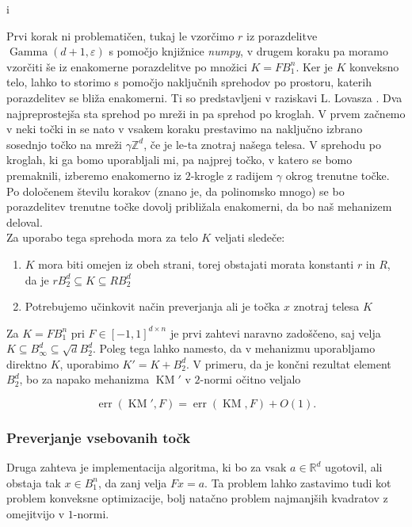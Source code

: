 i\documentclass[mat1]{fmfdelo}
\newcommand{\R}{\mathbb R}
\newcommand{\Z}{\mathbb Z}
\DeclareMathOperator{\KM}{KM}
\DeclareMathOperator*{\err}{err}
\begin{document}
Prvi korak ni problematičen, tukaj le vzorčimo $r$ iz porazdelitve $\operatorname{Gamma}(d+1, \varepsilon)$ s pomočjo knjižnice \emph{numpy}, v drugem koraku pa moramo vzorčiti še iz enakomerne porazdelitve po množici $K=FB_1^n$. Ker je $K$ konveksno telo, lahko to storimo s pomočjo naključnih sprehodov po prostoru, katerih porazdelitev se bliža enakomerni. Ti so predstavljeni v raziskavi L. Lovasza \cite{randomsurvey}.  Dva najpreprostejša sta sprehod po mreži in pa sprehod po kroglah. V prvem začnemo v neki točki in se nato v vsakem koraku prestavimo na naključno izbrano sosednjo točko na mreži $\gamma \Z^d$, če je le-ta znotraj našega telesa. V sprehodu po kroglah, ki ga bomo uporabljali mi, pa najprej točko, v katero se bomo premaknili, izberemo enakomerno iz $2$-krogle z radijem $\gamma$ okrog trenutne točke. Po določenem številu korakov (znano je, da polinomsko mnogo) se bo porazdelitev trenutne točke dovolj približala enakomerni, da bo naš mehanizem deloval. \\

\noindent Za uporabo tega sprehoda mora za telo $K$ veljati sledeče:
\begin{enumerate}
    \item $K$ mora biti omejen iz obeh strani, torej obstajati morata konstanti $r$ in $R$, da je $rB_2^d \subseteq K \subseteq RB_2^d$
    \item Potrebujemo učinkovit način preverjanja ali je točka $x$ znotraj telesa $K$
\end{enumerate}

Za $K=FB_1^n$ pri $F \in [-1,1]^{d\times n}$ je prvi zahtevi naravno zadoščeno, saj velja $K \subseteq B_\infty^d \subseteq \sqrt{d} B_2^d$. Poleg tega lahko namesto, da v mehanizmu uporabljamo direktno $K$, uporabimo $K' = K + B_2^d$. V primeru, da je končni rezultat element $B_2^d$, bo za napako mehanizma $\KM'$ v $2$-normi očitno veljalo

\begin{equation*}
    \err(\KM', F) = \err(\KM, F) + O(1).
\end{equation*}

\subsubsection{Preverjanje vsebovanih točk}
Druga zahteva je implementacija algoritma, ki bo za vsak $a \in \R^d$ ugotovil, ali obstaja tak $x \in B_1^n$, da zanj velja $Fx = a$. Ta problem lahko zastavimo tudi kot problem konveksne optimizacije, bolj natačno problem najmanjših kvadratov z omejitvijo v $1$-normi. \\
\end{document}
